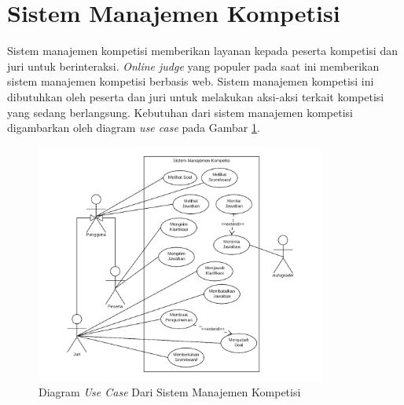 
\section{Sistem Manajemen Kompetisi}

\par Sistem manajemen kompetisi memberikan layanan kepada peserta kompetisi dan juri untuk berinteraksi. \textit{Online judge} yang populer pada saat ini memberikan sistem manajemen kompetisi berbasis web. Sistem manajemen kompetisi ini dibutuhkan oleh peserta dan juri untuk melakukan aksi-aksi terkait kompetisi yang sedang berlangsung. Kebutuhan dari sistem manajemen kompetisi digambarkan oleh diagram \textit{use case} pada Gambar \ref{fig:oj-use-case}.

\begin{figure}[ht!]
    \centering
    \includegraphics[width=0.85\textwidth]{images/oj-use-case}
    \caption{Diagram \textit{Use Case} Dari Sistem Manajemen Kompetisi}
    \label{fig:oj-use-case}
\end{figure}

